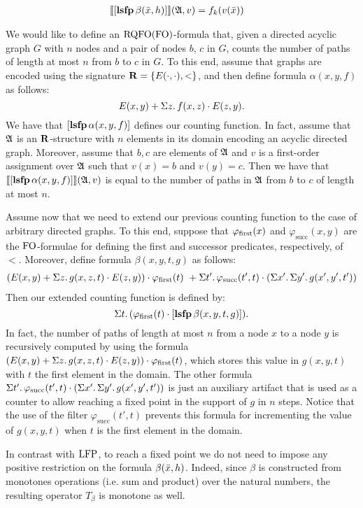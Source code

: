 \begin{align*}
{\llbracket{}{[{\bf lsfp} \, \beta(\bar{x}, h)]}\rrbracket}(\mathfrak{A},v) &= f_{k}(v(\bar{x}))
\end{align*}

\begin{exa} \label{ex:count-path}
We would like to define an ${\rm RQFO}({\rm FO})$-formula that, given a directed acyclic graph $G$ with $n$ nodes and a pair of nodes $b$, $c$ in $G$, counts the number of paths of length at most $n$ from $b$ to $c$ in $G$. To this end, assume that graphs are encoded using the signature $\mathbf{R} = \{ E(\cdot,\cdot), < \}$, and then define formula $\alpha(x, y, f)$ as follows:
$$ 
E(x,y) + \Sigma{z}.\, f(x,z)\cdot E(z,y).
$$
We have that $[{\bf lsfp} \, \alpha(x,y,f)]$ defines our counting function. In fact, assume that $\mathfrak{A}$ is an $\mathbf{R}$-structure with $n$ elements in its domain encoding an acyclic directed graph. Moreover, assume that $b,c$ are elements of $\mathfrak{A}$ and $v$ is a first-order assignment over $\mathfrak{A}$ such that $v(x) = b$ and $v(y) = c$. Then we have that ${\llbracket{}{[{\bf lsfp} \, \alpha(x,y,f)]}\rrbracket}(\mathfrak{A},v)$ is equal to the  number of paths in $\mathfrak{A}$ from $b$ to $c$ of length at most $n$.

Assume now that we need to extend our previous counting function to the case of arbitrary directed graphs. To this end, suppose that $\varphi_{\text{\rm first}}(x)$ and $\varphi_{\text{succ}}(x,y)$ are the ${\rm FO}$-formulae for defining the first and successor predicates, respectively, of $<$. Moreover, define formula $\beta(x, y, t, g)$ as follows:
\begin{align*}
(E(x,y) + \Sigma{z}.\, g(x,z,t)\cdot E(z,y)) \cdot \varphi_{\text{\rm first}}(t) \ +
\Sigma{t'}.\, \varphi_{\text{succ}}(t',t) \cdot \left(\Sigma{x'}.\, \Sigma{y'}.\, g(x',y',t') \right)
\end{align*}
Then our extended counting function is defined by:
$$
\Sigma{t}.\, (\varphi_{\text{\rm first}}(t) \cdot [{\bf lsfp} \, \beta(x,y,t,g)]).
$$ 
In fact, the number of paths of length at most $n$ from a node $x$ to a node $y$ is recursively computed by using the formula $(E(x,y) + \Sigma{z}.\, g(x,z,t)\cdot E(z,y)) \cdot \varphi_{\text{\rm first}}(t)$, which stores this value in $g(x,y,t)$ with $t$ the first element in the domain.  The other formula $\Sigma{t'}.\, \varphi_{\text{succ}}(t',t) \cdot \left(\Sigma{x'}.\, \Sigma{y'}.\, g(x',y',t') \right)$ is just an auxiliary artifact that is used as a counter to allow reaching a fixed point in the support of $g$ in $n$ steps. Notice that the use of the filter $\varphi_{\text{succ}}(t',t)$ prevents this formula for incrementing the value of $g(x,y,t)$ when $t$ is the first element in the domain.
\end{exa}
In contrast with ${\rm LFP}$, to reach a fixed point we do not need to impose any positive restriction on the formula $\beta(\bar{x},h)$.
Indeed, since $\beta$ is constructed from monotones operations (i.e. sum and product) over the natural numbers, the resulting operator $T_{\beta}$ is monotone as well.

